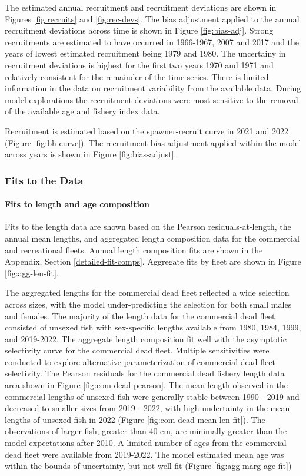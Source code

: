 \documentclass[11pt,
  english,
  letterpaper,
]{article}
\begin{document}
The estimated annual recruitment and recruitment deviations are shown in Figures \ref{fig:recruits} and \ref{fig:rec-devs}. The bias adjustment applied to the annual recruitment deviations across time is shown in Figure \ref{fig:bias-adj}. Strong recruitments are estimated to have occurred in 1966-1967, 2007 and 2017 and the years of lowest estimated recruitment being 1979 and 1980. The uncertainy in recruitment deviations is highest for the first two years 1970 and 1971 and relatively consistent for the remainder of the time series. There is limited information in the data on recruitment variability from the available data. During model explorations the recruitment deviations were most sensitive to the removal of the available age and fishery index data.

Recruitment is estimated based on the spawner-recruit curve in 2021 and 2022 (Figure \ref{fig:bh-curve}). The recruitment bias adjustment applied within the model across years is shown in Figure \ref{fig:bias-adjust}.

\hypertarget{fits-to-the-data}{%
\subsubsection{Fits to the Data}\label{fits-to-the-data}}

\hypertarget{fits-to-length-and-age-composition}{%
\paragraph{Fits to length and age composition}\label{fits-to-length-and-age-composition}}

Fits to the length data are shown based on the Pearson residuals-at-length, the annual mean lengths, and aggregated length composition data for the commercial and recreational fleets. Annual length composition fits are shown in the Appendix, Section \ref{detailed-fit-comps}. Aggregate fits by fleet are shown in Figure \ref{fig:agg-len-fit}.

The aggregated lengths for the commercial dead fleet reflected a wide selection across sizes, with the model under-predicting the selection for both small males and females. The majority of the length data for the commercial dead fleet consisted of unsexed fish with sex-specific lengths available from 1980, 1984, 1999, and 2019-2022. The aggregate length composition fit well with the asymptotic selectivity curve for the commercial dead fleet. Multiple sensitivities were conducted to explore alternative parameterization of commercial dead fleet selectivity. The Pearson residuals for the commercial dead fishery length data area shown in Figure \ref{fig:com-dead-pearson}. The mean length observed in the commercial lengths of unsexed fish were generally stable between 1990 - 2019 and decreased to smaller sizes from 2019 - 2022, with high undertainty in the mean lengths of unsexed fish in 2022 (Figure \ref{fig:com-dead-mean-len-fit}). The observations of larger fish, greater than 40 cm, are minimally greater than the model expectations after 2010. A limited number of ages from the commercial dead fleet were available from 2019-2022. The model estimated mean age was within the bounds of uncertainty, but not well fit (Figure \ref{fig:agg-marg-age-fit})
\end{document}
